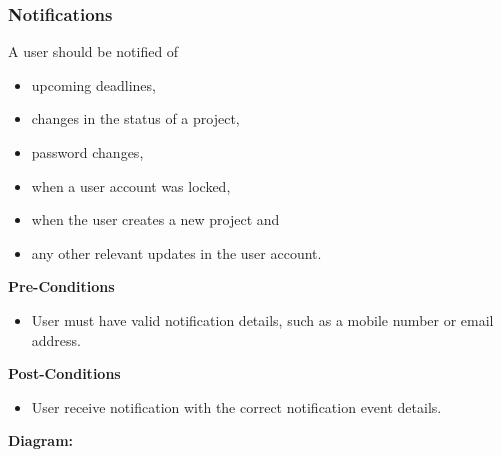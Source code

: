 \subsubsection{Notifications}
A user should be notified of
\begin{itemize}
	\item upcoming deadlines,
	\item changes in the status of a project,
	\item password changes,
	\item when a user account was locked,
	\item when the user creates a new project and
	\item any other relevant updates in the user account.
\end{itemize}
\textbf{Pre-Conditions}
\begin{itemize}
	\item User must have valid notification details, such as a mobile number or email address.
\end{itemize}
\textbf{Post-Conditions}
\begin{itemize}
	\item User receive notification with the correct notification event details.
\end{itemize}
\textbf{Diagram:}\\
\centerline{}
